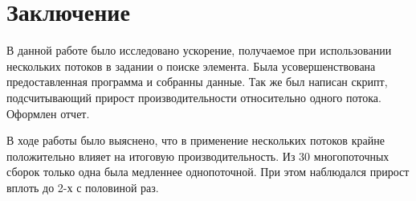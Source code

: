 \documentclass[a4paper, 12pt]{article}
\begin{document}




\section{Заключение}

В данной работе было исследовано ускорение, получаемое при использовании нескольких потоков в задании о поиске элемента.
Была усовершенствована предоставленная программа и собранны данные.
Так же был написан скрипт, подсчитывающий прирост производительности относительно одного потока.
Оформлен отчет.

В ходе работы было выяснено, что в применение нескольких потоков крайне положительно влияет на итоговую производительность.
Из 30 многопоточных сборок только одна была медленнее однопоточной.
При этом наблюдался прирост вплоть до 2-х с половиной раз.


\end{document}
